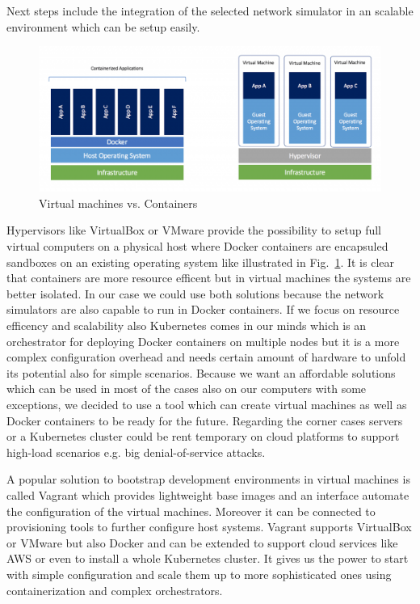 \documentclass[conference]{IEEEtran}
\begin{document}
Next steps include the integration of the selected network simulator in an scalable environment which can be setup easily. 

\begin{figure}[htbp]
\centerline{\includegraphics[scale=0.25]{docker_vm.png}}
\caption{Virtual machines vs. Containers \cite{b8}}
\label{docker-vm}
\end{figure}

Hypervisors like VirtualBox or VMware provide the possibility to setup full virtual computers on a physical host where Docker containers are encapsuled sandboxes on an existing operating system like illustrated in Fig.~\ref{docker-vm}. It is clear that containers are more resource efficent but in virtual machines the systems are better isolated. In our case we could use both solutions because the network simulators are also capable to run in Docker containers. If we focus on resource efficency and scalability also Kubernetes comes in our minds which is an orchestrator for deploying Docker containers on multiple nodes but it is a more complex configuration overhead and needs certain amount of hardware to unfold its potential also for simple scenarios. Because we want an affordable solutions which can be used in most of the cases also on our computers with some exceptions, we decided to use a tool which can create virtual machines as well as Docker containers to be ready for the future. Regarding the corner cases servers or a Kubernetes cluster could be rent temporary on cloud platforms to support high-load scenarios e.g. big denial-of-service attacks.

A popular solution to bootstrap development environments in virtual machines is called Vagrant which provides lightweight base images and an interface automate the configuration of the virtual machines. Moreover it can be connected to provisioning tools to further configure host systems. Vagrant supports VirtualBox or VMware but also Docker and can be extended to support cloud services like AWS or even to install a whole Kubernetes cluster. It gives us the power to start with simple configuration and scale them up to more sophisticated ones using containerization and complex orchestrators. \cite{b9}
\end{document}
